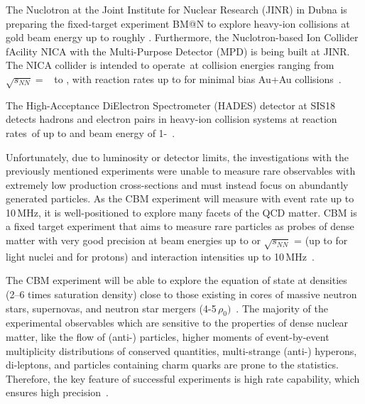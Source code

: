 The Nuclotron at the Joint Institute for Nuclear Research (JINR) in Dubna is preparing the fixed-target experiment BM@N to explore heavy-ion collisions at gold beam energy up to roughly . Furthermore, the Nuclotron-based Ion Collider fAcility NICA with the Multi-Purpose Detector (MPD) is being built at JINR. The NICA collider is intended to operate at collision energies ranging from $\sqrt{s_{NN}} =$~ to , with reaction rates up to  for minimal bias Au+Au collisions~\cite{Ablyazimov_2017}.

The High-Acceptance DiElectron Spectrometer (\gls{HADES}) detector at SIS18 detects hadrons and electron pairs in heavy-ion collision systems at reaction rates of up to  and beam energy of 1-~\cite{Ablyazimov_2017}.


Unfortunately, due to luminosity or detector limits, the investigations with the previously mentioned experiments were unable to measure rare observables with extremely low production cross-sections and must instead focus on abundantly generated particles. As the \gls{CBM} experiment will measure with event rate up to 10\,MHz, it is well-positioned to explore many facets of the \gls{QCD} matter. \gls{CBM} is a fixed target experiment that aims to measure rare particles as probes of dense matter with very good precision at beam energies up to  or $\sqrt{s_{NN}}$ =  (up to  for light nuclei and  for protons) and interaction intensities up to 10\,MHz~\cite{cbmus}.

The \gls{CBM} experiment will be able to explore the equation of state at densities (2–6 times saturation density) close to those existing in cores of massive neutron stars, supernovas, and neutron star mergers (4-5\,$\rho_{0})$~\cite{Senger_2020}. The majority of the experimental observables which are sensitive to the properties of dense nuclear matter, like the flow of (anti-) particles, higher moments of event-by-event multiplicity distributions of conserved quantities, multi-strange (anti-) hyperons, di-leptons, and particles containing charm quarks are prone to the statistics. Therefore, the key feature of successful experiments is high rate capability, which ensures high precision~\cite{Ablyazimov_2017}. 

